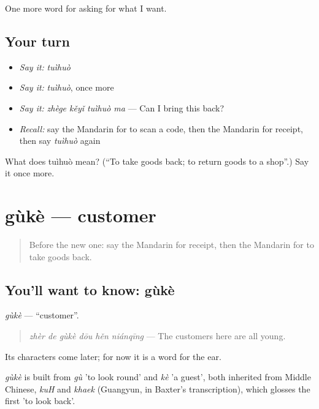 \begin{grammarlens}[title={What you've built}]
One more word for asking for what I want.
\end{grammarlens}

\subsection*{Your turn}
\begin{itemize}
\raggedright
  \item \emph{Say it:} \emph{tuìhuò}
  \item \emph{Say it:} \emph{tuìhuò}, once more
  \item \emph{Say it:} \emph{zhège kěyǐ tuìhuò ma} — Can I bring this back?
  \item \emph{Recall:} say the Mandarin for to scan a code, then the Mandarin for receipt, then say \emph{tuìhuò} again
\end{itemize}

\begin{tcolorbox}[breakable,colback=teal!4,colframe=teal!35!black,title={Before you move on}]
What does tuìhuò mean? (\textquotedblleft{}To take goods back; to return goods to a shop\textquotedblright{}.) Say it once more.
\end{tcolorbox}
\section[gùkè]{gùkè — customer}

\label{lesson:ZH-C202-guke}



\begin{quote}
Before the new one: say the Mandarin for receipt, then the Mandarin for to take goods back.
\end{quote}

\subsection*{You'll want to know: gùkè}
\emph{gùkè} — \textquotedblleft{}customer\textquotedblright{}.

\begin{quote}
\emph{zhèr de gùkè dōu hěn niánqīng} — The customers here are all young.
\end{quote}

Its characters come later; for now it is a word for the ear.

\begin{cousinweb}
\emph{gùkè} is built from \emph{gù} 'to look round' and \emph{kè} 'a guest', both inherited from Middle Chinese, \emph{kuH} and \emph{khaek} (Guangyun, in Baxter's transcription), which glosses the first 'to look back'.
\end{cousinweb}


